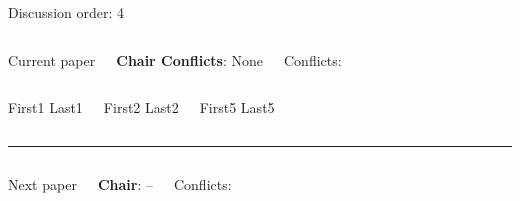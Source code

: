 \documentclass[9pt,t,serif]{beamer}
\begin{document}
\begin{frame}[t]{Discussion order: 4}
\begin{columns}[t]
Current paper 

\textbf{Chair Conflicts}: None

Conflicts:

\vspace{10pt}

\end{columns}
\begin{columns}[t]
First1 Last1

First2 Last2

First5 Last5

\end{columns}
\vspace{10pt}
\hrule
\vspace{10pt}
\begin{columns}[t]


 Next paper

\textbf{Chair}: --

Conflicts:

\vspace{10pt}

\end{columns}
\begin{columns}[t]
\end{columns}
\end{frame}
\end{document}
